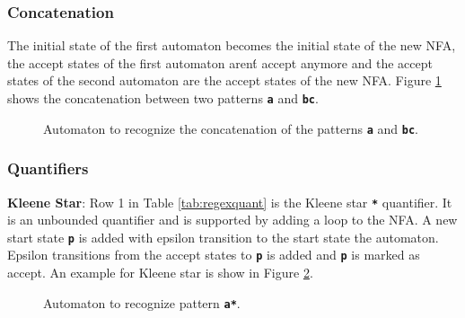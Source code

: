 \subsubsection{Concatenation}
The initial state of the first automaton becomes the initial state of the new NFA, the accept states of the first automaton aren\'t accept anymore and the accept states of the second automaton are the accept states of the new NFA. Figure \ref{fig:auto3} shows the concatenation between two patterns \texttt{\textbf{a}} and \texttt{\textbf{bc}}.

\begin{figure}[htpb]
\centering
{}
\caption{Automaton to recognize the concatenation of the patterns \texttt{\textbf{a}} and \texttt{\textbf{bc}}.}
\label{fig:auto3}
\end{figure}

\subsubsection{Quantifiers}
\textbf{Kleene Star}: Row 1 in Table \ref{tab:regexquant} is the Kleene star \texttt{\textbf{*}} quantifier. It is an unbounded quantifier and is supported by adding a loop to the NFA. A new start state \texttt{\textbf{p}} is added with epsilon transition to the start state the automaton. Epsilon transitions from the accept states to \texttt{\textbf{p}} is added and \texttt{\textbf{p}} is marked as accept. An example for Kleene star is show in Figure \ref{fig:autoq1}.

\begin{figure}[H]
\centering
{}
\caption{Automaton to recognize pattern \texttt{\textbf{a*}}.}
\label{fig:autoq1}
\end{figure}



